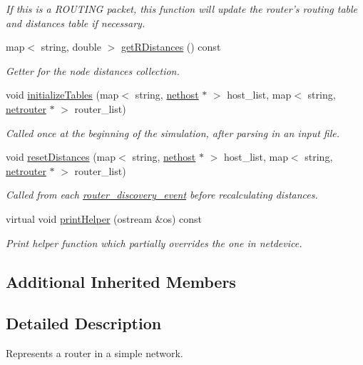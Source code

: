 \begin{DoxyCompactItemize}
\begin{DoxyCompactList}\small\item\em If this is a R\-O\-U\-T\-I\-N\-G packet, this function will update the router's routing table and distances table if necessary. \end{DoxyCompactList}\item 
map$<$ string, double $>$ \hyperlink{classnetrouter_a58bea34e24bde952a64af47713be636f}{get\-R\-Distances} () const 
\begin{DoxyCompactList}\small\item\em Getter for the node distances collection. \end{DoxyCompactList}\item 
void \hyperlink{classnetrouter_a1a5540f9e742b6d4938401bfa54a2d02}{initialize\-Tables} (map$<$ string, \hyperlink{classnethost}{nethost} $\ast$ $>$ host\-\_\-list, map$<$ string, \hyperlink{classnetrouter}{netrouter} $\ast$ $>$ router\-\_\-list)
\begin{DoxyCompactList}\small\item\em Called once at the beginning of the simulation, after parsing in an input file. \end{DoxyCompactList}\item 
void \hyperlink{classnetrouter_a87c029bb86c80acc8a5c2878835ef5a1}{reset\-Distances} (map$<$ string, \hyperlink{classnethost}{nethost} $\ast$ $>$ host\-\_\-list, map$<$ string, \hyperlink{classnetrouter}{netrouter} $\ast$ $>$ router\-\_\-list)
\begin{DoxyCompactList}\small\item\em Called from each \hyperlink{classrouter__discovery__event}{router\-\_\-discovery\-\_\-event} before recalculating distances. \end{DoxyCompactList}\item 
virtual void \hyperlink{classnetrouter_abdb4669cfddd028629f6abedc38a9427}{print\-Helper} (ostream \&os) const 
\begin{DoxyCompactList}\small\item\em Print helper function which partially overrides the one in {\ttfamily netdevice}. \end{DoxyCompactList}\end{DoxyCompactItemize}
\subsection*{Additional Inherited Members}


\subsection{Detailed Description}
Represents a router in a simple network. 


